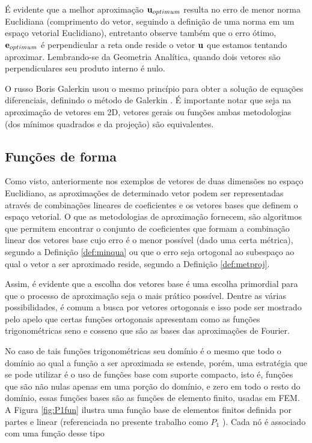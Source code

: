   É evidente que a melhor aproximação $\bm{\mathrm{u}}_{optimum}$ resulta no erro de menor
  norma Euclidiana (comprimento do vetor, seguindo a definição de uma norma em
  um espaço vetorial Euclidiano), entretanto observe também que o erro ótimo,
  $\bm{\mathrm{e}}_{optimum}$ é perpendicular a reta onde reside o vetor $\bm{\mathrm{u}}$ que
  estamos tentando aproximar. Lembrando-se da Geometria Analítica, quando dois
  vetores são perpendiculares seu produto interno é nulo.  

  O russo Boris Galerkin usou o mesmo  princípio para obter a solução de equações
  diferenciais, definindo o método de Galerkin \cite{reddy1993introduction}. É
  importante notar que seja na aproximação de vetores em 2D, vetores gerais ou
  funções ambas metodologias (dos mínimos quadrados e da projeção) são equivalentes.
  
	\subsection{Funções de forma}
	Como visto, anteriormente nos exemplos de vetores de duas dimensões no espaço
  Euclidiano, as aproximações de determinado vetor podem ser representadas
  através de combinações lineares de coeficientes e os vetores bases que definem
  o espaço vetorial. O que as metodologias de aproximação fornecem, são
  algoritmos que permitem encontrar o conjunto de coeficientes que formam a
  combinação linear dos vetores base cujo erro é o menor possível (dado uma certa métrica), segundo a Definição \ref{def:minqua} ou que o erro seja ortogonal ao subespaço ao qual o vetor a ser aproximado reside, segundo a Definição \ref{def:metproj}.

  	Assim, é evidente que a escolha dos vetores base é uma escolha primordial para que o processo de aproximação seja o mais prático possível. Dentre as várias possibilidades, é comum a busca por vetores ortogonais e isso pode ser mostrado pelo apelo que certas funções ortogonais apresentam como as funções trigonométricas seno e cosseno que são as bases das aproximações de Fourier.

  	No caso de tais funções trigonométricas seu domínio é o mesmo que todo o
    domínio ao qual a função a ser aproximada se estende, porém, uma estratégia
    que se pode utilizar é o uso de funções base com suporte compacto, isto é,
    funções que são não nulas apenas em uma porção do domínio, e zero em todo o
    resto do domínio, essas funções bases são as funções de elemento finito,
    usadas em FEM. A Figura \ref{fig:P1fun} ilustra uma função base de elementos
    finitos definida por partes e linear (referenciada no presente trabalho como
    $P_1$ \cite{arnold2014periodic}). Cada nó é associado com uma função desse tipo

